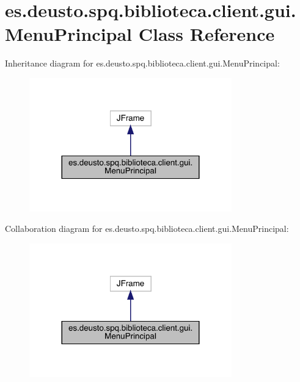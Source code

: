 \hypertarget{classes_1_1deusto_1_1spq_1_1biblioteca_1_1client_1_1gui_1_1_menu_principal}{}\section{es.\+deusto.\+spq.\+biblioteca.\+client.\+gui.\+Menu\+Principal Class Reference}
\label{classes_1_1deusto_1_1spq_1_1biblioteca_1_1client_1_1gui_1_1_menu_principal}


Inheritance diagram for es.\+deusto.\+spq.\+biblioteca.\+client.\+gui.\+Menu\+Principal\+:
\nopagebreak
\begin{figure}[H]
\begin{center}
\leavevmode
\includegraphics[width=248pt]{classes_1_1deusto_1_1spq_1_1biblioteca_1_1client_1_1gui_1_1_menu_principal__inherit__graph}
\end{center}
\end{figure}


Collaboration diagram for es.\+deusto.\+spq.\+biblioteca.\+client.\+gui.\+Menu\+Principal\+:
\nopagebreak
\begin{figure}[H]
\begin{center}
\leavevmode
\includegraphics[width=248pt]{classes_1_1deusto_1_1spq_1_1biblioteca_1_1client_1_1gui_1_1_menu_principal__coll__graph}
\end{center}
\end{figure}
